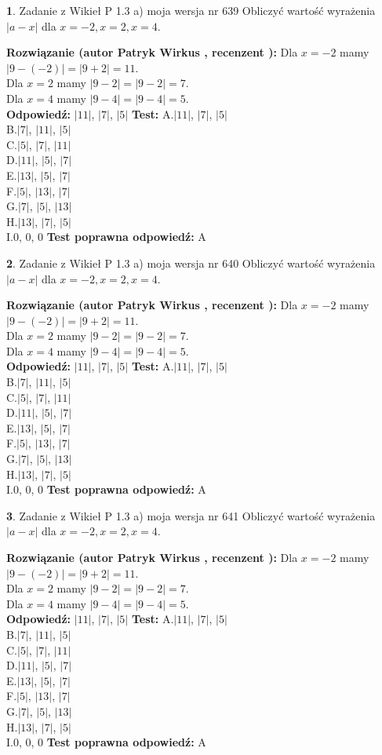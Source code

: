 \documentclass[12pt, a4paper]{article}
\theoremstyle{definition} %
\newtheorem{zad}{}
\newcommand{\zadStart}[1]{\begin{zad}#1\newline}
\newcommand{\zadStop}{\end{zad}}
\newcommand{\rozwStart}[2]{\noindent \textbf{Rozwiązanie (autor #1 , recenzent #2): }\newline}
\newcommand{\rozwStop}{\newline}
\newcommand{\odpStart}{\noindent \textbf{Odpowiedź:}\newline}
\newcommand{\odpStop}{\newline}
\newcommand{\testStart}{\noindent \textbf{Test:}\newline}
\newcommand{\testStop}{\newline}
\newcommand{\kluczStart}{\noindent \textbf{Test poprawna odpowiedź:}\newline}
\newcommand{\kluczStop}{\newline}
\begin{document}
\zadStart{Zadanie z Wikieł P 1.3 a) moja wersja nr 639}
Obliczyć wartość wyrażenia $|a - x|$ dla $x=-2,x=2,x=4$.
\zadStop
\rozwStart{Patryk Wirkus}{}
Dla $x = -2$ mamy $|9 - (-2)| = |9 + 2| = 11$.\\
Dla $x = 2$ mamy $|9 - 2| = |9 - 2| = 7$.\\
Dla $x = 4$ mamy $|9 - 4| = |9 - 4| = 5$.\\
\rozwStop
\odpStart
$|11|$, $|7|$, $|5|$
\odpStop
\testStart
A.$|11|$, $|7|$, $|5|$\\
B.$|7|$, $|11|$, $|5|$\\
C.$|5|$, $|7|$, $|11|$\\
D.$|11|$, $|5|$, $|7|$\\
E.$|13|$, $|5|$, $|7|$\\
F.$|5|$, $|13|$, $|7|$\\
G.$|7|$, $|5|$, $|13|$\\
H.$|13|$, $|7|$, $|5|$\\
I.$0$, $0$, $0$
\testStop
\kluczStart
A
\kluczStop



\zadStart{Zadanie z Wikieł P 1.3 a) moja wersja nr 640}
Obliczyć wartość wyrażenia $|a - x|$ dla $x=-2,x=2,x=4$.
\zadStop
\rozwStart{Patryk Wirkus}{}
Dla $x = -2$ mamy $|9 - (-2)| = |9 + 2| = 11$.\\
Dla $x = 2$ mamy $|9 - 2| = |9 - 2| = 7$.\\
Dla $x = 4$ mamy $|9 - 4| = |9 - 4| = 5$.\\
\rozwStop
\odpStart
$|11|$, $|7|$, $|5|$
\odpStop
\testStart
A.$|11|$, $|7|$, $|5|$\\
B.$|7|$, $|11|$, $|5|$\\
C.$|5|$, $|7|$, $|11|$\\
D.$|11|$, $|5|$, $|7|$\\
E.$|13|$, $|5|$, $|7|$\\
F.$|5|$, $|13|$, $|7|$\\
G.$|7|$, $|5|$, $|13|$\\
H.$|13|$, $|7|$, $|5|$\\
I.$0$, $0$, $0$
\testStop
\kluczStart
A
\kluczStop



\zadStart{Zadanie z Wikieł P 1.3 a) moja wersja nr 641}
Obliczyć wartość wyrażenia $|a - x|$ dla $x=-2,x=2,x=4$.
\zadStop
\rozwStart{Patryk Wirkus}{}
Dla $x = -2$ mamy $|9 - (-2)| = |9 + 2| = 11$.\\
Dla $x = 2$ mamy $|9 - 2| = |9 - 2| = 7$.\\
Dla $x = 4$ mamy $|9 - 4| = |9 - 4| = 5$.\\
\rozwStop
\odpStart
$|11|$, $|7|$, $|5|$
\odpStop
\testStart
A.$|11|$, $|7|$, $|5|$\\
B.$|7|$, $|11|$, $|5|$\\
C.$|5|$, $|7|$, $|11|$\\
D.$|11|$, $|5|$, $|7|$\\
E.$|13|$, $|5|$, $|7|$\\
F.$|5|$, $|13|$, $|7|$\\
G.$|7|$, $|5|$, $|13|$\\
H.$|13|$, $|7|$, $|5|$\\
I.$0$, $0$, $0$
\testStop
\kluczStart
A
\kluczStop
\end{document}
